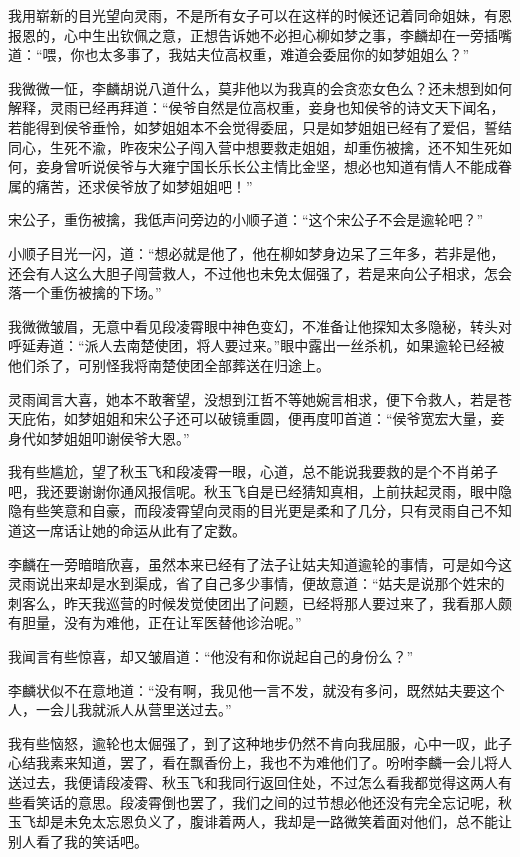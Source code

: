 我用崭新的目光望向灵雨，不是所有女子可以在这样的时候还记着同命姐妹，有恩报恩的，心中生出钦佩之意，正想告诉她不必担心柳如梦之事，李麟却在一旁插嘴道：“喂，你也太多事了，我姑夫位高权重，难道会委屈你的如梦姐姐么？”

我微微一怔，李麟胡说八道什么，莫非他以为我真的会贪恋女色么？还未想到如何解释，灵雨已经再拜道：“侯爷自然是位高权重，妾身也知侯爷的诗文天下闻名，若能得到侯爷垂怜，如梦姐姐本不会觉得委屈，只是如梦姐姐已经有了爱侣，誓结同心，生死不渝，昨夜宋公子闯入营中想要救走姐姐，却重伤被擒，还不知生死如何，妾身曾听说侯爷与大雍宁国长乐长公主情比金坚，想必也知道有情人不能成眷属的痛苦，还求侯爷放了如梦姐姐吧！”

宋公子，重伤被擒，我低声问旁边的小顺子道：“这个宋公子不会是逾轮吧？”

小顺子目光一闪，道：“想必就是他了，他在柳如梦身边呆了三年多，若非是他，还会有人这么大胆子闯营救人，不过他也未免太倔强了，若是来向公子相求，怎会落一个重伤被擒的下场。”

我微微皱眉，无意中看见段凌霄眼中神色变幻，不准备让他探知太多隐秘，转头对呼延寿道：“派人去南楚使团，将人要过来。”眼中露出一丝杀机，如果逾轮已经被他们杀了，可别怪我将南楚使团全部葬送在归途上。

灵雨闻言大喜，她本不敢奢望，没想到江哲不等她婉言相求，便下令救人，若是苍天庇佑，如梦姐姐和宋公子还可以破镜重圆，便再度叩首道：“侯爷宽宏大量，妾身代如梦姐姐叩谢侯爷大恩。”

我有些尴尬，望了秋玉飞和段凌霄一眼，心道，总不能说我要救的是个不肖弟子吧，我还要谢谢你通风报信呢。秋玉飞自是已经猜知真相，上前扶起灵雨，眼中隐隐有些笑意和自豪，而段凌霄望向灵雨的目光更是柔和了几分，只有灵雨自己不知道这一席话让她的命运从此有了定数。

李麟在一旁暗暗欣喜，虽然本来已经有了法子让姑夫知道逾轮的事情，可是如今这灵雨说出来却是水到渠成，省了自己多少事情，便故意道：“姑夫是说那个姓宋的刺客么，昨天我巡营的时候发觉使团出了问题，已经将那人要过来了，我看那人颇有胆量，没有为难他，正在让军医替他诊治呢。”

我闻言有些惊喜，却又皱眉道：“他没有和你说起自己的身份么？”

李麟状似不在意地道：“没有啊，我见他一言不发，就没有多问，既然姑夫要这个人，一会儿我就派人从营里送过去。”

我有些恼怒，逾轮也太倔强了，到了这种地步仍然不肯向我屈服，心中一叹，此子心结我素来知道，罢了，看在飘香份上，我也不为难他们了。吩咐李麟一会儿将人送过去，我便请段凌霄、秋玉飞和我同行返回住处，不过怎么看我都觉得这两人有些看笑话的意思。段凌霄倒也罢了，我们之间的过节想必他还没有完全忘记呢，秋玉飞却是未免太忘恩负义了，腹诽着两人，我却是一路微笑着面对他们，总不能让别人看了我的笑话吧。

